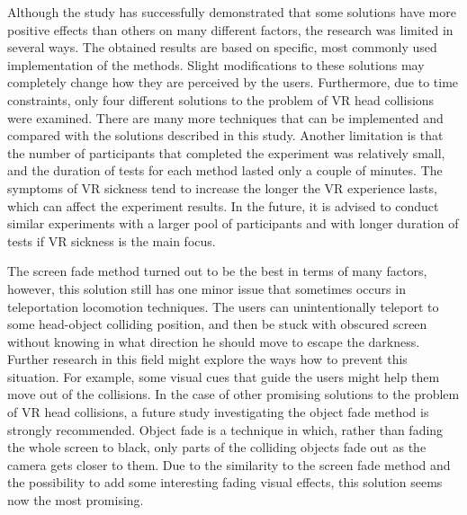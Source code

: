 Although the study has successfully demonstrated that some solutions have more positive effects than others on many different factors, the research was limited in several ways. The obtained results are based on specific, most commonly used implementation of the methods. Slight modifications to these solutions may completely change how they are perceived by the users. Furthermore, due to time constraints, only four different solutions to the problem of VR head collisions were examined. There are many more techniques that can be implemented and compared with the solutions described in this study. Another limitation is that the number of participants that completed the experiment was relatively small, and the duration of tests for each method lasted only a couple of minutes. The symptoms of VR sickness tend to increase the longer the VR experience lasts, which can affect the experiment results. In the future, it is advised to conduct similar experiments with a larger pool of participants and with longer duration of tests if VR sickness is the main focus.

The screen fade method turned out to be the best in terms of many factors, however, this solution still has one minor issue that sometimes occurs in teleportation locomotion techniques. The users can unintentionally teleport to some head-object colliding position, and then be stuck with obscured screen without knowing in what direction he should move to escape the darkness. Further research in this field might explore the ways how to prevent this situation. For example, some visual cues that guide the users might help them move out of the collisions. In the case of other promising solutions to the problem of VR head collisions, a future study investigating the object fade method is strongly recommended. Object fade is a technique in which, rather than fading the whole screen to black, only parts of the colliding objects fade out as the camera gets closer to them. Due to the similarity to the screen fade method and the possibility to add some interesting fading visual effects, this solution seems now the most promising.